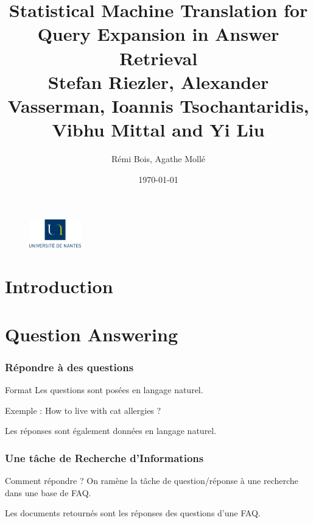 \documentclass[10pt]{beamer}
\title{Statistical Machine Translation for Query Expansion in Answer
  Retrieval\\ 
\small
Stefan Riezler, Alexander Vasserman, Ioannis Tsochantaridis, Vibhu
Mittal and Yi Liu}
\author{Rémi Bois, Agathe Mollé}
\date{\today}
\begin{document}
\begin{frame}
  \maketitle
  \vfill
  \begin{figure}
    \includegraphics[width=0.20\textwidth]{logo_univ_nantes}
  \end{figure}

\end{frame}

\begin{frame}
  \tableofcontents
\end{frame}

\section{Introduction}
\label{sec:intro}


\section{Question Answering}
\label{sec:QA}

\begin{frame}
  \frametitle{Répondre à des questions}
  \begin{block}{Format}
    Les questions sont posées en langage naturel.

    Exemple : How to live with cat allergies ?

    Les réponses sont également données en langage naturel.
  \end{block}
\end{frame}

\begin{frame}
  \frametitle{Une tâche de Recherche d'Informations}

  \begin{block}{Comment répondre ?}
    On ramène la tâche de question/réponse à une recherche dans une
    base de FAQ. 

    Les documents retournés sont les réponses des
    questions d'une FAQ.
  \end{block}
\end{frame}
\end{document}

